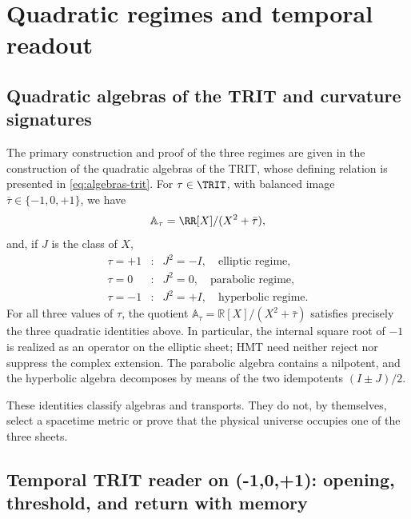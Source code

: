 \section{Quadratic regimes and temporal readout}
\label{v:rec:chap:regimenes-cuadraticos-tiempo}

\subsection{Quadratic algebras of the TRIT and curvature signatures}
\label{v:rec:sec:regimenes-cuadraticos-recibidos}

The primary construction and proof of the three regimes are given in
the construction of the quadratic algebras of the TRIT,
whose defining relation is presented in \eqref{eq:algebras-trit}. For
\(\tau\in\TRIT\), with balanced image
\(\bar\tau\in\{-1,0,+1\}\), we have
\[
 \mathbb A_\tau=\RR[X]/(X^2+\bar\tau),
\]
and, if \(J\) is the class of \(X\),
\[
\begin{array}{ccl}
 \tau=+1&:&J^2=-I,\quad\text{elliptic regime},\\
 \tau=0&:&J^2=0,\quad\text{parabolic regime},\\
 \tau=-1&:&J^2=+I,\quad\text{hyperbolic regime}.
\end{array}
\]
For all three values of \(\tau\), the quotient
\(\mathbb A_\tau=\mathbb R[X]/(X^2+\bar\tau)\) satisfies precisely the three
quadratic identities above. In particular, the internal square root of
\(-1\) is realized as an operator on the elliptic sheet; HMT need neither reject nor
suppress the complex extension. The parabolic algebra contains a nilpotent,
and the hyperbolic algebra decomposes by means of the two idempotents
\((I\pm J)/2\).

These identities classify algebras and transports. They do not, by themselves,
select a spacetime metric or prove that the physical universe occupies one
of the three sheets.

\subsection{Temporal TRIT reader on ({-1,0,+1}): opening, threshold, and return with memory}
\label{v:rec:sec:lector-temporal-trit}

